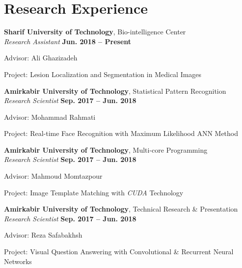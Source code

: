 \section{\sc Research Experience}
{\bf Sharif University of Technology}, Bio-intelligence Center \\ 
\vspace{0.1cm}
\textit{Research Assistant} \hfill{\textbf{Jun. 2018 -- Present}} \\
\vspace{-0.4cm}
\begin{list2}
	\item Advisor: Ali Ghazizadeh
	\item Project: Lesion Localization and Segmentation in Medical Images
\end{list2}

{\bf Amirkabir University of Technology}, Statistical Pattern Recognition \\ 
\vspace{0.1cm}
\textit{Research Scientist} \hfill{\textbf{Sep. 2017 -- Jun. 2018}} \\
\vspace{-0.4cm}
\begin{list2}
	\item Advisor: Mohammad Rahmati
	\item Project: Real-time Face Recognition with Maximum Likelihood ANN Method
\end{list2}

{\bf Amirkabir University of Technology}, Multi-core Programming \\ 
\vspace{0.1cm}
\textit{Research Scientist} \hfill{\textbf{Sep. 2017 -- Jun. 2018}} \\
\vspace{-0.4cm}
\begin{list2}
	\item Advisor: Mahmoud Momtazpour
	\item Project: Image Template Matching with \textit{CUDA} Technology
\end{list2}

{\bf Amirkabir University of Technology}, Technical Research \& Presentation\\ 
\vspace{0.1cm}
\textit{Research Scientist} \hfill{\textbf{Sep. 2017 -- Jun. 2018}} \\
\vspace{-0.4cm}
\begin{list2}
	\item Advisor: Reza Safabakhsh
	\item Project: Visual Question Answering with Convolutional \& Recurrent Neural Networks
\end{list2}
\endinput